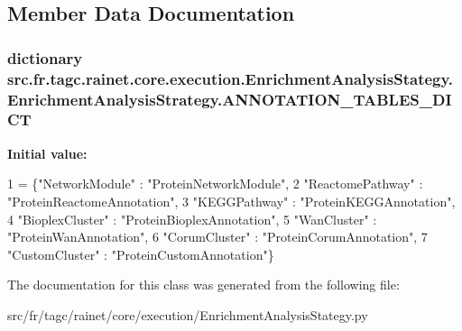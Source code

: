 \subsection{Member Data Documentation}
\hypertarget{classsrc_1_1fr_1_1tagc_1_1rainet_1_1core_1_1execution_1_1EnrichmentAnalysisStategy_1_1EnrichmentAnalysisStrategy_ad3e2ab37bb2a64a33dd5533a01203e66}{
\subsubsection[{A\-N\-N\-O\-T\-A\-T\-I\-O\-N\-\_\-\-T\-A\-B\-L\-E\-S\-\_\-\-D\-I\-C\-T}]{\setlength{\rightskip}{0pt plus 5cm}dictionary src.\-fr.\-tagc.\-rainet.\-core.\-execution.\-Enrichment\-Analysis\-Stategy.\-Enrichment\-Analysis\-Strategy.\-A\-N\-N\-O\-T\-A\-T\-I\-O\-N\-\_\-\-T\-A\-B\-L\-E\-S\-\_\-\-D\-I\-C\-T\hspace{0.3cm}{\ttfamily [static]}}}\label{classsrc_1_1fr_1_1tagc_1_1rainet_1_1core_1_1execution_1_1EnrichmentAnalysisStategy_1_1EnrichmentAnalysisStrategy_ad3e2ab37bb2a64a33dd5533a01203e66}
{\bfseries Initial value\-:}
\begin{DoxyCode}
1 = \{\textcolor{stringliteral}{"NetworkModule"} : \textcolor{stringliteral}{"ProteinNetworkModule"},
2                               \textcolor{stringliteral}{"ReactomePathway"} : \textcolor{stringliteral}{"ProteinReactomeAnnotation"},
3                               \textcolor{stringliteral}{"KEGGPathway"} : \textcolor{stringliteral}{"ProteinKEGGAnnotation"},
4                               \textcolor{stringliteral}{"BioplexCluster"} : \textcolor{stringliteral}{"ProteinBioplexAnnotation"},
5                               \textcolor{stringliteral}{"WanCluster"} : \textcolor{stringliteral}{"ProteinWanAnnotation"},
6                               \textcolor{stringliteral}{"CorumCluster"} : \textcolor{stringliteral}{"ProteinCorumAnnotation"},
7                               \textcolor{stringliteral}{"CustomCluster"} : \textcolor{stringliteral}{"ProteinCustomAnnotation"}\}
\end{DoxyCode}


The documentation for this class was generated from the following file\-:\begin{DoxyCompactItemize}
\item 
src/fr/tagc/rainet/core/execution/Enrichment\-Analysis\-Stategy.\-py\end{DoxyCompactItemize}
